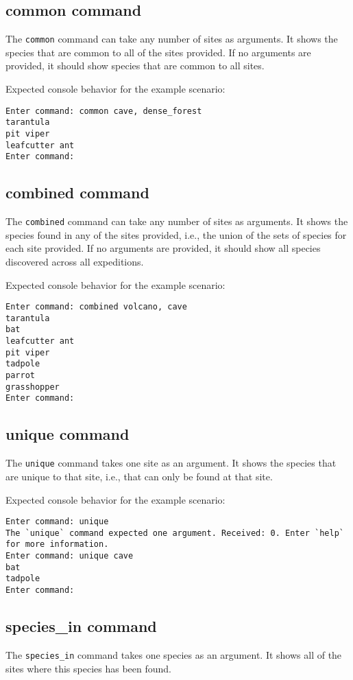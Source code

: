 \documentclass[12pt,letterpaper]{article}
\begin{document}
\subsection{common command}
The \texttt{common} command can take any number of sites as arguments. It shows the species that are common to all of the sites provided. If no arguments are provided, it should show species that are common to all sites.

Expected console behavior for the example scenario:
\begin{lstlisting}
Enter command: common cave, dense_forest
tarantula
pit viper
leafcutter ant
Enter command: 
\end{lstlisting}

\subsection{combined command}
The \texttt{combined} command can take any number of sites as arguments. It shows the species found in any of the sites provided, i.e., the union of the sets of species for each site provided. If no arguments are provided, it should show all species discovered across all expeditions.

Expected console behavior for the example scenario:
\begin{lstlisting}
Enter command: combined volcano, cave
tarantula
bat
leafcutter ant
pit viper
tadpole
parrot
grasshopper
Enter command: 
\end{lstlisting}

\subsection{unique command}
The \texttt{unique} command takes one site as an argument. It shows the species that are unique to that site, i.e., that can only be found at that site.

Expected console behavior for the example scenario:
\begin{lstlisting}
Enter command: unique
The `unique` command expected one argument. Received: 0. Enter `help` for more information.
Enter command: unique cave
bat
tadpole
Enter command: 
\end{lstlisting}

\subsection{species\_in command}
The \texttt{species\_in} command takes one species as an argument. It shows all of the sites where this species has been found.
\end{document}
